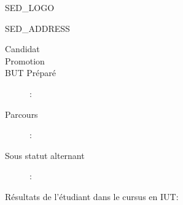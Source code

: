 \documentclass{article}
\begin{document}
\begin{minipage}[T]{0.51\textwidth}
    SED_LOGO
    \vfill
\end{minipage}%
\hfill
\vline
\hfill
\begin{minipage}[T]{0.45\textwidth}
    \raggedleft
    SED_ADDRESS
\end{minipage}

\vspace{1em}
\begin{center}
\end{center}
\vspace{0.5em}
\begin{center}
    \begin{description}
        \item[Candidat] \candidat
        \item[Promotion] \promotion
        \item[BUT Préparé]: \but
        \item[Parcours]: \parcours
        \item[Sous statut alternant]: \alternant
    \end{description}
\end{center}
\vspace{1em}
\noindent Résultats de l'étudiant dans le cursus en IUT:
\end{document}
